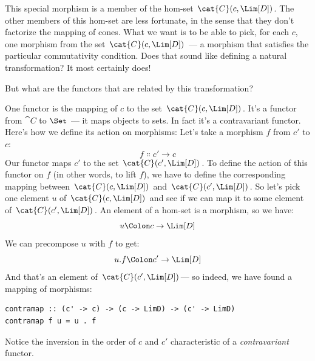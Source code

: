 This special morphism is a member of the hom-set $\cat{C}(c, \Lim[D])$.
The other members of this hom-set are less fortunate, in the sense that
they don't factorize the mapping of cones. What we want is to be able to
pick, for each $c$, one morphism from the set
$\cat{C}(c, \Lim[D])$ --- a morphism that satisfies the particular
commutativity condition. Does that sound like defining a natural
transformation? It most certainly does!

But what are the functors that are related by this transformation?

One functor is the mapping of $c$ to the set
$\cat{C}(c, \Lim[D])$. It's a functor from $\cat{C}$ to $\Set$ ---
it maps objects to sets. In fact it's a contravariant functor. Here's
how we define its action on morphisms: Let's take a morphism $f$
from $c'$ to $c$:
\[f \Colon c' \to c\]
Our functor maps $c'$ to the set
$\cat{C}(c', \Lim[D])$. To define the action of this functor on
$f$ (in other words, to lift $f$), we have to define the
corresponding mapping between $\cat{C}(c, \Lim[D])$ and
$\cat{C}(c', \Lim[D])$. So let's pick one element $u$ of
$\cat{C}(c, \Lim[D])$ and see if we can map it to some element of
$\cat{C}(c', \Lim[D])$. An element of a hom-set is a morphism, so
we have:
\[u \Colon c \to \Lim[D]\]
We can precompose $u$ with $f$ to get:
\[u . f \Colon c' \to \Lim[D]\]
And that's an element of $\cat{C}(c', \Lim[D])$--- so indeed, we
have found a mapping of morphisms:

\begin{Verbatim}
contramap :: (c' -> c) -> (c -> LimD) -> (c' -> LimD) 
contramap f u = u . f
\end{Verbatim}

Notice the inversion in the order of $c$ and $c'$
characteristic of a \emph{contravariant} functor.

\begin{figure}[H]
\centering
{}
\end{figure}

